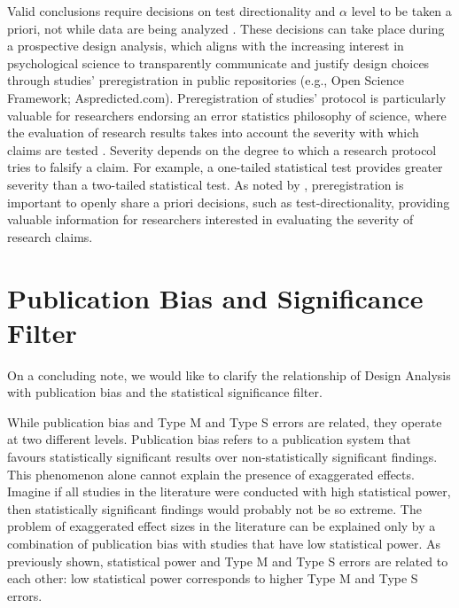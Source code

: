 \documentclass{article}\usepackage[]{graphicx}\usepackage[]{color}
\begin{document}
Valid conclusions require decisions on test directionality and $\alpha$ level to be taken a priori, not while data are being analyzed \parencite{cohenStatisticalPowerAnalysis1988}. These decisions can take place during a prospective design analysis, which aligns with the increasing interest in psychological science to transparently communicate and justify design choices through studies’ preregistration in public repositories (e.g., Open Science Framework; Aspredicted.com). Preregistration of studies’ protocol is particularly valuable for researchers endorsing an error statistics philosophy of science, where the evaluation of research results takes into account the severity with which claims are tested \parencite{lakensValuePreregistrationPsychological2019,mayoStatisticalInferenceSevere2018}. Severity depends on the degree to which a research protocol tries to falsify a claim. For example, a one-tailed statistical test provides greater severity than a two-tailed statistical test. As noted by \textcite{lakensValuePreregistrationPsychological2019}, preregistration is important to openly share a priori decisions, such as test-directionality, providing valuable information for researchers interested in evaluating the severity of research claims.



\section{Publication Bias and Significance Filter}

On a concluding note, we would like to clarify the relationship of Design Analysis with publication bias and the statistical significance filter.

While publication bias and Type M and Type S errors are related, they operate at two different levels. Publication bias refers to a publication system that favours statistically significant results over non-statistically significant findings. This phenomenon alone cannot explain the presence of exaggerated effects. Imagine if all studies in the literature were conducted with high statistical power, then statistically significant findings would probably not be so extreme. The problem of exaggerated effect sizes in the literature can be explained only by a combination of publication bias with studies that have low statistical power. As previously shown, statistical power and Type M and Type S errors are related to each other: low statistical power corresponds to higher Type M and Type S errors.
\end{document}
